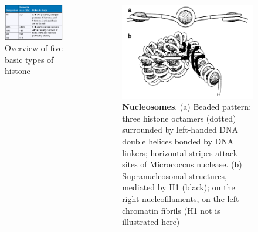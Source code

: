 \documentclass[11pt,dvipsnames,ignorenonframetext,aspectratio=169]{beamer}
\begin{document}
\begin{frame}{}
\protect\hypertarget{section-11}{}
\begin{columns}[T,onlytextwidth]
  
  
\begin{figure}
\includegraphics[width=0.65\linewidth]{../images/histone_types} \caption{Overview of five basic types of histone}\label{fig:histone-types}
\end{figure}


\begin{figure}
\includegraphics[width=0.8\linewidth]{../images/nucleosome_structure} \caption{\textbf{Nucleosomes}. (a) Beaded pattern: three histone octamers (dotted) surrounded by left-handed DNA double helices bonded by DNA linkers; horizontal stripes attack sites of Micrococcus nuclease. (b) Supranucleosomal structures, mediated by H1 (black); on the right nucleofilaments, on the left chromatin fibrils (H1 not is illustrated here)}\label{fig:nucleosome-structure}
\end{figure}

\end{columns}
\end{frame}
\end{document}
